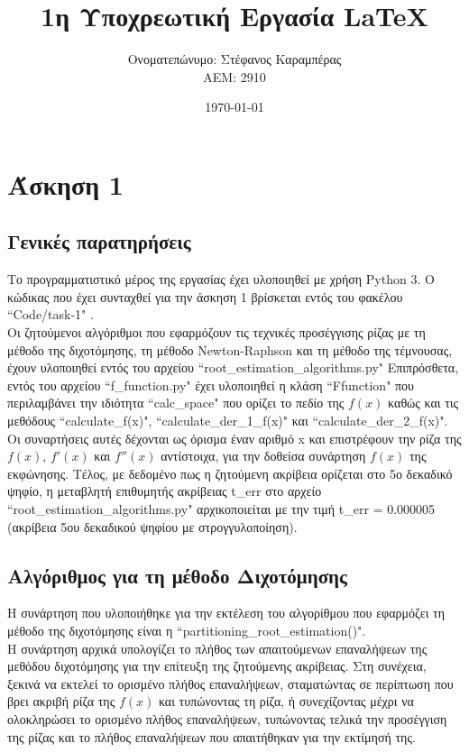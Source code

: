 \documentclass[a4paper,11pt]{article}
\title{1η Υποχρεωτική Εργασία \lt LaTeX} %
\author{Ονοματεπώνυμο: Στέφανος Καραμπέρας  \\  ΑΕΜ: 2910}       %
\date{\today}                                      %
\newcommand{\lt}{\latintext}
\begin{document}

\maketitle

\section*{Άσκηση 1}
\subsection*{Γενικές παρατηρήσεις}
Το προγραμματιστικό μέρος της εργασίας έχει υλοποιηθεί με χρήση {\lt Python 3}.
Ο κώδικας που έχει συνταχθεί για την άσκηση 1 βρίσκεται εντός του φακέλου {\lt ``Code/task-1" }.\\
Οι ζητούμενοι αλγόριθμοι που εφαρμόζουν τις τεχνικές προσέγγισης ρίζας με τη μέθοδο της διχοτόμησης, τη μέθοδο {\lt Newton-Raphson} και τη μέθοδο της τέμνουσας, έχουν υλοποιηθεί
εντός του αρχείου {\lt ``root\_estimation\_algorithms.py"}
Επιπρόσθετα, εντός του αρχείου {\lt ``f\_function.py"} έχει υλοποιηθεί η κλάση {\lt ``Ffunction"} που περιλαμβάνει την ιδιότητα {\lt ``calc\_space"} που ορίζει το πεδίο της {\lt $f(x)$} καθώς και τις μεθόδους {\lt ``calculate\_f(x)"}, {\lt ``calculate\_der\_1\_f(x)"} και {\lt ``calculate\_der\_2\_f(x)"}. Οι συναρτήσεις αυτές δέχονται ως όρισμα έναν αριθμό {\lt x} και επιστρέφουν την ρίζα της {\lt $f(x)$}, {\lt $f'(x)$} και {\lt $f''(x)$} αντίστοιχα,  για την δοθείσα συνάρτηση {\lt $f(x)$} της εκφώνησης. Τέλος, με δεδομένο πως η ζητούμενη ακρίβεια ορίζεται στο 5ο δεκαδικό ψηφίο, η μεταβλητή επιθυμητής ακρίβειας {\lt t\_err}  στο αρχείο {\lt ``root\_estimation\_algorithms.py"} αρχικοποιείται με την τιμή {\lt t\_err} = 0.000005 (ακρίβεια 5ου δεκαδικού ψηφίου με στρογγυλοποίηση).
\subsection*{Αλγόριθμος για τη μέθοδο Διχοτόμησης}
Η συνάρτηση που υλοποιήθηκε για την εκτέλεση του αλγορίθμου που εφαρμόζει τη μέθοδο της διχοτόμησης είναι η {\lt ``partitioning\_root\_estimation()"}. \\
Η συνάρτηση αρχικά υπολογίζει το πλήθος των απαιτούμενων επαναλήψεων της μεθόδου διχοτόμησης για την επίτευξη της ζητούμενης ακρίβειας. Στη συνέχεια, ξεκινά να εκτελεί το ορισμένο πλήθος επαναλήψεων, 			σταματώντας σε περίπτωση που βρει ακριβή ρίζα της {\lt$f(x)$} και τυπώνοντας τη ρίζα, ή συνεχίζοντας μέχρι να ολοκληρώσει το ορισμένο πλήθος επαναλήψεων, τυπώνοντας τελικά την προσέγγιση της ρίζας και το 		πλήθος επαναλήψεων που απαιτήθηκαν για την εκτίμησή της.\\
\end{document}
